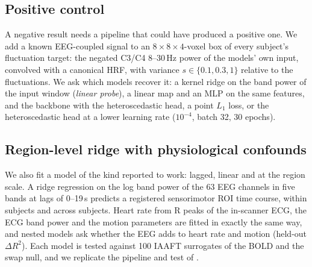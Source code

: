 \subsection{Positive control}\label{sec:positive}
A negative result needs a pipeline that could have produced a positive one. We add a known EEG-coupled signal to an $8\times8\times4$-voxel box of every subject's fluctuation target: the negated C3/C4 8--30\,Hz power of the models' own input, convolved with a canonical HRF, with variance $s\in\{0.1,0.3,1\}$ relative to the fluctuations. We ask which models recover it: a kernel ridge on the band power of the input window (\emph{linear probe}), a linear map and an MLP on the same features, and the backbone with the heteroscedastic head, a point $L_1$ loss, or the heteroscedastic head at a lower learning rate ($10^{-4}$, batch 32, 30 epochs).

\subsection{Region-level ridge with physiological confounds}\label{sec:ridge}
We also fit a model of the kind reported to work: lagged, linear and at the region scale. A ridge regression \citep{hoerl1970ridge} on the log band power of the 63 EEG channels in five bands at lags of 0--19\,s predicts a registered sensorimotor ROI time course, within subjects and across subjects. Heart rate from R peaks of the in-scanner ECG, the ECG band power and the motion parameters are fitted in exactly the same way, and nested models ask whether the EEG adds to heart rate and motion (held-out $\Delta R^2$). Each model is tested against 100 IAAFT surrogates of the BOLD \citep{schreiber1996improved} and the swap null, and we replicate the pipeline and test of \citet{mehta2025eegbold}.
